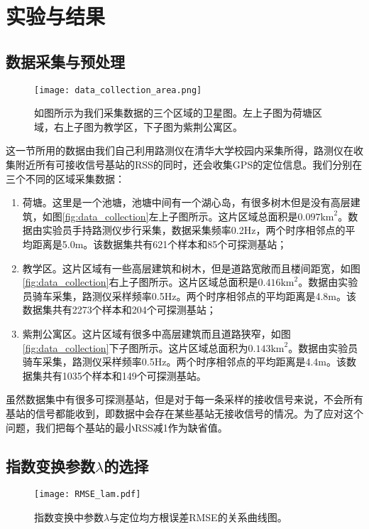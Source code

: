 \section{实验与结果} \label{sec:exp}

\subsection{数据采集与预处理}

\begin{figure}[tb]
	\centering
	\texttt{[image: data\_collection\_area.png]}
	\caption{如图所示为我们采集数据的三个区域的卫星图。左上子图为荷塘区域，右上子图为教学区，下子图为紫荆公寓区。}
	\label{fig:data_collection}
\end{figure}

这一节所用的数据由我们自己利用路测仪在清华大学校园内采集所得，路测仪在收集附近所有可接收信号基站的RSS的同时，还会收集GPS的定位信息。我们分别在三个不同的区域采集数据：
\begin{enumerate}
	\item 荷塘。这里是一个池塘，池塘中间有一个湖心岛，有很多树木但是没有高层建筑，如图\eqref{fig:data_collection}左上子图所示。这片区域总面积是$0.097\mathrm{km}^2$。数据由实验员手持路测仪步行采集，数据采集频率0.2Hz，两个时序相邻点的平均距离是5.0m。该数据集共有621个样本和85个可探测基站；
	\item 教学区。这片区域有一些高层建筑和树木，但是道路宽敞而且楼间距宽，如图\eqref{fig:data_collection}右上子图所示。这片区域总面积是$0.416\mathrm{km}^2$。数据由实验员骑车采集，路测仪采样频率0.5Hz。两个时序相邻点的平均距离是4.8m。该数据集共有2273个样本和204个可探测基站；
	\item 紫荆公寓区。这片区域有很多中高层建筑而且道路狭窄，如图\eqref{fig:data_collection}下子图所示。这片区域总面积为$0.143\mathrm{km}^2$。数据由实验员骑车采集，路测仪采样频率0.5Hz。两个时序相邻点的平均距离是4.4m。该数据集共有1035个样本和149个可探测基站。
\end{enumerate}

虽然数据集中有很多可探测基站，但是对于每一条采样的接收信号来说，不会所有基站的信号都能收到，即数据中会存在某些基站无接收信号的情况。为了应对这个问题，我们把每个基站的最小RSS减1作为缺省值。

\subsection{指数变换参数$\lambda$的选择} \label{subsec:lambda}

\begin{figure}[tb]
\centering
\texttt{[image: RMSE\_lam.pdf]}
\caption{指数变换中参数$\lambda$与定位均方根误差RMSE的关系曲线图。}
\label{fig:rmse_lam}
\end{figure}

